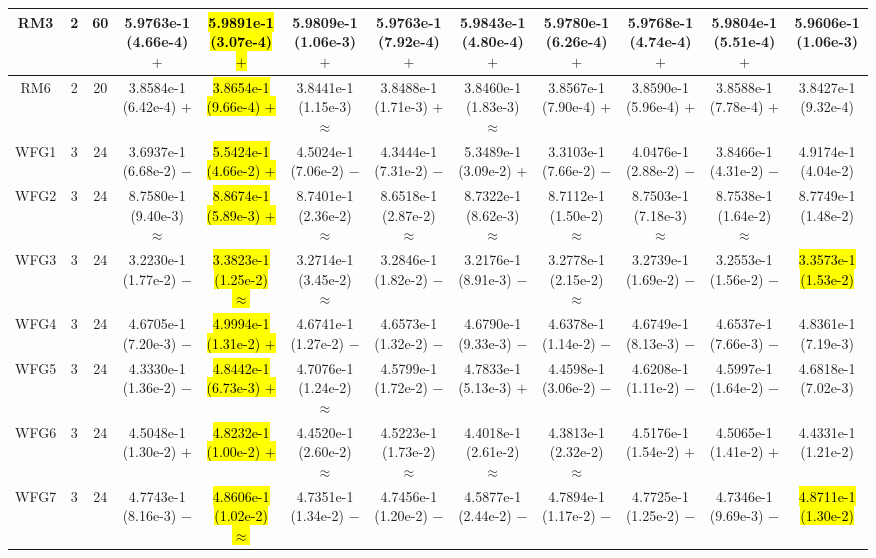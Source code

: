 \documentclass[journal]{IEEEtran}
\begin{document}
\begin{table*}[htbp]
\begin{tabular}{cccccccccccc}
\hline
\multirow{1}{*}{RM3}&2&60&5.9763e-1 (4.66e-4) $+$&\hl{5.9891e-1 (3.07e-4) $+$}&5.9809e-1 (1.06e-3) $+$&5.9763e-1 (7.92e-4) $+$&5.9843e-1 (4.80e-4) $+$&5.9780e-1 (6.26e-4) $+$&5.9768e-1 (4.74e-4) $+$&5.9804e-1 (5.51e-4) $+$&5.9606e-1 (1.06e-3)\\
\hline
\multirow{1}{*}{RM6}&2&20&3.8584e-1 (6.42e-4) $+$&\hl{3.8654e-1 (9.66e-4) $+$}&3.8441e-1 (1.15e-3) $\approx$&3.8488e-1 (1.71e-3) $+$&3.8460e-1 (1.83e-3) $\approx$&3.8567e-1 (7.90e-4) $+$&3.8590e-1 (5.96e-4) $+$&3.8588e-1 (7.78e-4) $+$&3.8427e-1 (9.32e-4)\\
\hline
\multirow{1}{*}{WFG1}&3&24&3.6937e-1 (6.68e-2) $-$&\hl{5.5424e-1 (4.66e-2) $+$}&4.5024e-1 (7.06e-2) $-$&4.3444e-1 (7.31e-2) $-$&5.3489e-1 (3.09e-2) $+$&3.3103e-1 (7.66e-2) $-$&4.0476e-1 (2.88e-2) $-$&3.8466e-1 (4.31e-2) $-$&4.9174e-1 (4.04e-2)\\
\hline
\multirow{1}{*}{WFG2}&3&24&8.7580e-1 (9.40e-3) $\approx$&\hl{8.8674e-1 (5.89e-3) $+$}&8.7401e-1 (2.36e-2) $\approx$&8.6518e-1 (2.87e-2) $\approx$&8.7322e-1 (8.62e-3) $\approx$&8.7112e-1 (1.50e-2) $\approx$&8.7503e-1 (7.18e-3) $\approx$&8.7538e-1 (1.64e-2) $\approx$&8.7749e-1 (1.48e-2)\\
\hline
\multirow{1}{*}{WFG3}&3&24&3.2230e-1 (1.77e-2) $-$&\hl{3.3823e-1 (1.25e-2) $\approx$}&3.2714e-1 (3.45e-2) $\approx$&3.2846e-1 (1.82e-2) $-$&3.2176e-1 (8.91e-3) $-$&3.2778e-1 (2.15e-2) $\approx$&3.2739e-1 (1.69e-2) $-$&3.2553e-1 (1.56e-2) $-$&\hl{3.3573e-1 (1.53e-2)}\\
\hline
\multirow{1}{*}{WFG4}&3&24&4.6705e-1 (7.20e-3) $-$&\hl{4.9994e-1 (1.31e-2) $+$}&4.6741e-1 (1.27e-2) $-$&4.6573e-1 (1.32e-2) $-$&4.6790e-1 (9.33e-3) $-$&4.6378e-1 (1.14e-2) $-$&4.6749e-1 (8.13e-3) $-$&4.6537e-1 (7.66e-3) $-$&4.8361e-1 (7.19e-3)\\
\hline
\multirow{1}{*}{WFG5}&3&24&4.3330e-1 (1.36e-2) $-$&\hl{4.8442e-1 (6.73e-3) $+$}&4.7076e-1 (1.24e-2) $\approx$&4.5799e-1 (1.72e-2) $-$&4.7833e-1 (5.13e-3) $+$&4.4598e-1 (3.06e-2) $-$&4.6208e-1 (1.11e-2) $-$&4.5997e-1 (1.64e-2) $-$&4.6818e-1 (7.02e-3)\\
\hline
\multirow{1}{*}{WFG6}&3&24&4.5048e-1 (1.30e-2) $+$&\hl{4.8232e-1 (1.00e-2) $+$}&4.4520e-1 (2.60e-2) $\approx$&4.5223e-1 (1.73e-2) $\approx$&4.4018e-1 (2.61e-2) $\approx$&4.3813e-1 (2.32e-2) $\approx$&4.5176e-1 (1.54e-2) $+$&4.5065e-1 (1.41e-2) $+$&4.4331e-1 (1.21e-2)\\
\hline
\multirow{1}{*}{WFG7}&3&24&4.7743e-1 (8.16e-3) $-$&\hl{4.8606e-1 (1.02e-2) $\approx$}&4.7351e-1 (1.34e-2) $-$&4.7456e-1 (1.20e-2) $-$&4.5877e-1 (2.44e-2) $-$&4.7894e-1 (1.17e-2) $-$&4.7725e-1 (1.25e-2) $-$&4.7346e-1 (9.69e-3) $-$&\hl{4.8711e-1 (1.30e-2)}\\

\end{tabular}
\end{table*}
\end{document}
